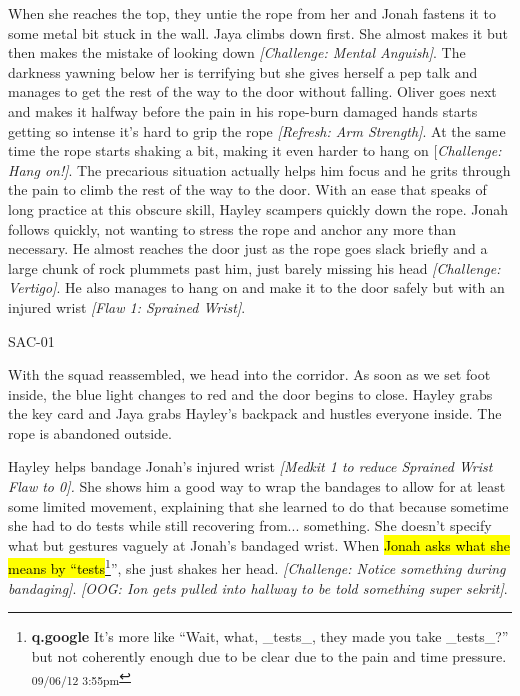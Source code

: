 When she reaches the top, they untie the rope from her and Jonah fastens it to some metal bit stuck in the wall.  Jaya climbs down first.  She almost makes it but then makes the mistake of looking down \textit{{[}Challenge: Mental Anguish{]}}.  The darkness yawning below her is terrifying but she gives herself a pep talk and manages to get the rest of the way to the door without falling.  Oliver goes next and makes it halfway before the pain in his rope-burn damaged hands starts getting so intense it's hard to grip the rope \textit{{[}Refresh: Arm Strength{]}}.  At the same time the rope starts shaking a bit, making it even harder to hang on {[}\textit{Challenge: Hang on!{]}}.  The precarious situation actually helps him focus and he grits through the pain to climb the rest of the way to the door.   With an ease that speaks of long practice at this obscure skill, Hayley scampers quickly down the rope.  Jonah follows quickly, not wanting to stress the rope and anchor any more than necessary.  He almost reaches the door just as the rope goes slack briefly and a large chunk of rock plummets past him, just barely missing his head \textit{{[}Challenge: Vertigo{]}}.  He also manages to hang on and make it to the door safely but with an injured wrist \textit{{[}Flaw 1: Sprained Wrist{]}}.



 {\LARGE SAC-01 } 



With the squad reassembled, we head into the corridor.  As soon as we set foot inside, the blue light changes to red and the door begins to close.  Hayley grabs the key card and Jaya grabs Hayley's backpack and hustles everyone inside.  The rope is abandoned outside.



Hayley helps bandage Jonah's injured wrist \textit{{[}Medkit 1 to reduce Sprained Wrist Flaw to 0{]}.}  She shows him a good way to wrap the bandages to allow for at least some limited movement, explaining that she learned to do that because sometime she had to do tests while still recovering from... something.  She doesn't specify what but gestures vaguely at Jonah's bandaged wrist.  When \hl{Jonah asks what she means by ``tests}\footnote{\textbf{q.google }It's more like ``Wait, what, \_tests\_, they made you take \_tests\_?'' but not coherently enough due to be clear due to the pain and time pressure. \textsubscript{09/06/12 3:55pm}}'', she just shakes her head. \textit{{[}Challenge: Notice something during bandaging{]}}.  \textit{{[}OOG: Ion gets pulled into hallway to be told something super sekrit{]}}.



